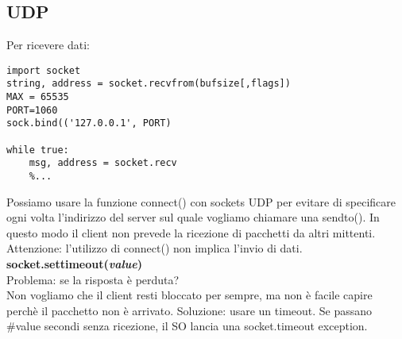 \subsection{UDP}

Per ricevere dati:
\begin{lstlisting}
import socket
string, address = socket.recvfrom(bufsize[,flags])
MAX = 65535
PORT=1060
sock.bind(('127.0.0.1', PORT)

while true:
	msg, address = socket.recv
	%...
\end{lstlisting}
Possiamo usare la funzione connect() con sockets UDP per evitare di specificare ogni volta l'indirizzo del server sul quale vogliamo chiamare una sendto(). In questo modo il client non prevede la ricezione di pacchetti da altri mittenti.\\
Attenzione: l'utilizzo di connect() non implica l'invio di dati.\\
\textbf{socket.settimeout(\textit{value})}\\
Problema: se la risposta è perduta?\\
Non vogliamo che il client resti bloccato per sempre, ma non è facile capire perchè il pacchetto non è arrivato.
Soluzione: usare un timeout. Se passano \#value secondi senza ricezione, il SO lancia una socket.timeout exception.
